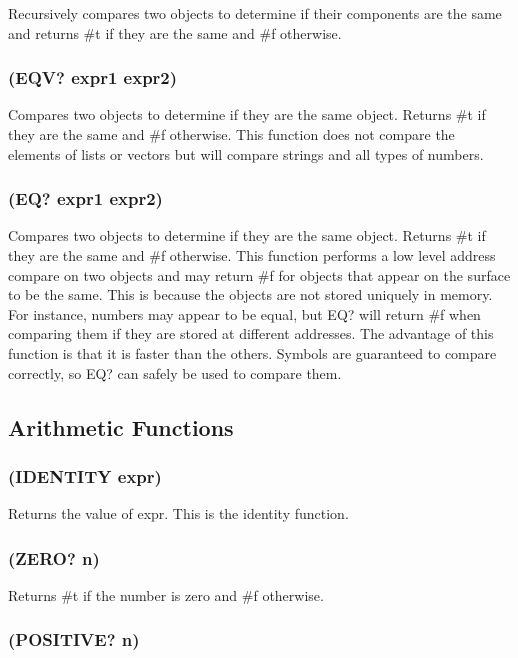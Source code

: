 \documentclass[11pt]{article}
\begin{document}
Recursively compares two objects to determine if their components are
the same and returns \#t if they are the same and \#f otherwise.
\subsubsection{(EQV? expr1 expr2)}
\label{sec-4-24-2}

Compares two objects to determine if they are the same object.
Returns \#t if they are the same and \#f otherwise.  This function does
not compare the elements of lists or vectors but will compare strings
and all types of numbers.
\subsubsection{(EQ? expr1 expr2)}
\label{sec-4-24-3}

Compares two objects to determine if they are the same object.
Returns \#t if they are the same and \#f otherwise.  This function
performs a low level address compare on two objects and may return \#f
for objects that appear on the surface to be the same.  This is
because the objects are not stored uniquely in memory.  For instance,
numbers may appear to be equal, but EQ? will return \#f when comparing
them if they are stored at different addresses.  The advantage of
this function is that it is faster than the others.  Symbols are
guaranteed to compare correctly, so EQ? can safely be used to compare
them.
\subsection{Arithmetic Functions}
\label{sec-4-25}

\subsubsection{(IDENTITY expr)}
\label{sec-4-25-1}

Returns the value of expr.  This is the identity function.
\subsubsection{(ZERO? n)}
\label{sec-4-25-2}

Returns \#t if the number is zero and \#f otherwise.
\subsubsection{(POSITIVE? n)}
\label{sec-4-25-3}
\end{document}

